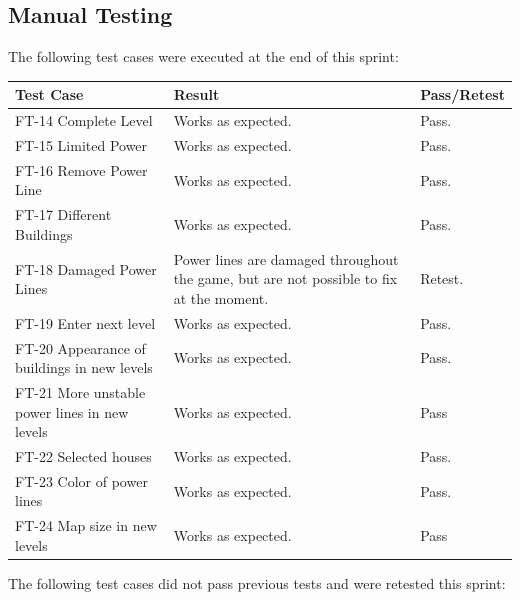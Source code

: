 \subsection{Manual Testing}

	The following test cases were executed at the end of this sprint:


	\begin{tabular}{| p{3cm} | p{7cm} | p{2cm} |}
		\hline
		\rowcolor{lightgray}
		{\bf Test Case} & {\bf Result} & {\bf Pass/Retest} \\ \hline

	  	FT-14 Complete Level & Works as expected. & Pass. \\ \hline
	  	
	  	FT-15 Limited Power & Works as expected. & Pass. \\ \hline
	  	
	  	FT-16 Remove Power Line & Works as expected. & Pass. \\ \hline
	  		  	
	  	FT-17 Different Buildings & Works as expected. & Pass. \\ \hline

	  	FT-18 Damaged Power Lines & Power lines are damaged throughout the game, but are not possible 
	  	to fix at the moment. & Retest. \\ \hline
	  	
	  	FT-19 Enter next level & Works as expected. & Pass. \\ \hline

	  	FT-20 Appearance of buildings in new levels & Works as expected. & Pass. \\ \hline

	  	FT-21 More unstable power lines in new levels & Works as expected. & Pass \\ \hline

	  	FT-22 Selected houses & Works as expected. & Pass. \\ \hline

	  	FT-23 Color of power lines & Works as expected. & Pass. \\ \hline

	  	FT-24 Map size in new levels & Works as expected. & Pass \\ \hline

	\end{tabular}

	The following test cases did not pass previous tests and were retested this sprint:

